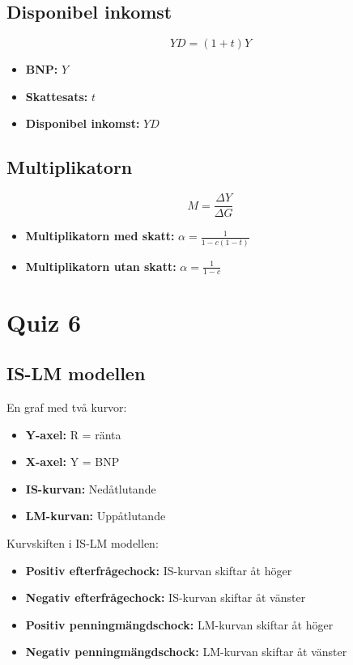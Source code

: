\documentclass[12pt,a4paper]{article}
\begin{document}
\subsection{Disponibel inkomst}
\[
YD = (1+t)Y
\]
\begin{itemize}
    \item \textbf{BNP: }$Y$
    \item \textbf{Skattesats: }$t$
    \item \textbf{Disponibel inkomst: }$YD$
\end{itemize}

\subsection{Multiplikatorn}
\[
M = \frac{\Delta Y}{\Delta G}
\]
\begin{itemize}
    \item \textbf{Multiplikatorn med skatt: }{\large $\alpha = \frac{1}{1 - c(1-t)}$}
    \item \textbf{Multiplikatorn utan skatt: }{\large $\alpha = \frac{1}{1 - c}$}
\end{itemize}

\section{Quiz 6}
\subsection{IS-LM modellen}
En graf med två kurvor:
\begin{itemize}
    \item \textbf{Y-axel: }R = ränta
    \item \textbf{X-axel: }Y = BNP
    \item \textbf{IS-kurvan: }Nedåtlutande
    \item \textbf{LM-kurvan: }Uppåtlutande
\end{itemize}

Kurvskiften i IS-LM modellen:
\begin{itemize}
    \item \textbf{Positiv efterfrågechock: }IS-kurvan skiftar åt höger
    \item \textbf{Negativ efterfrågechock: }IS-kurvan skiftar åt vänster
    \item \textbf{Positiv penningmängdschock: }LM-kurvan skiftar åt höger
    \item \textbf{Negativ penningmängdschock: }LM-kurvan skiftar åt vänster
\end{itemize}
\end{document}
